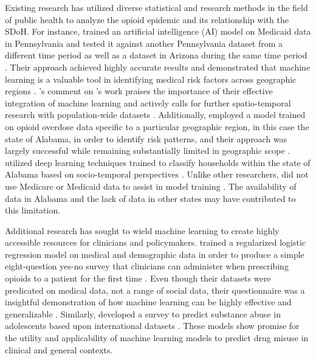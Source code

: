 \documentclass[journal]{IEEEtran}
\begin{document}
	Existing research has utilized diverse statistical and research methods in the field of public health to analyze the opioid epidemic and its relationship with the SDoH. For instance, \citeauthor{lo-ciganicDevelopingValidatingMachinelearning2022} trained an artificial intelligence (AI) model on Medicaid data in Pennsylvania and tested it against another Pennsylvania dataset from a different time period as well as a dataset in Arizona during the same time period \cite{lo-ciganicDevelopingValidatingMachinelearning2022}. Their approach achieved highly accurate results and demonstrated that machine learning is a valuable tool in identifying medical risk factors across geographic regions \cite{lo-ciganicDevelopingValidatingMachinelearning2022}. \citeauthor{allenOpportunitiesOpioidOverdose2022}'s comment on \citeauthor{lo-ciganicDevelopingValidatingMachinelearning2022}'s work praises the importance of their effective integration of machine learning and actively calls for further spatio-temporal research with population-wide datasets \cite{allenOpportunitiesOpioidOverdose2022}. Additionally, \citeauthor{partonMachineLearningApproach2026} employed a model trained on opioid overdose data specific to a particular geographic region, in this case the state of Alabama, in order to identify risk patterns, and their approach was largely successful while remaining substantially limited in geographic scope \cite{partonMachineLearningApproach2026}. \citeauthor{wuDeepLearningbasedSpatiotemporal2026} utilized deep learning techniques trained to classify households within the state of Alabama based on socio-temporal perspectives \cite{wuDeepLearningbasedSpatiotemporal2026}. Unlike other researchers, \citeauthor{wuDeepLearningbasedSpatiotemporal2026} did not use Medicare or Medicaid data to assist in model training \cite{wuDeepLearningbasedSpatiotemporal2026}. The availability of data in Alabama and the lack of data in other states may have contributed to this limitation.

	Additional research has sought to wield machine learning to create highly accessible resources for clinicians and policymakers. \citeauthor{repsWisdomCROUDDevelopment2020} trained a regularized logistic regression model on medical and demographic data in order to produce a simple eight-question yes-no survey that clinicians can administer when prescribing opioids to a patient for the first time \cite{repsWisdomCROUDDevelopment2020}. Even though their datasets were predicated on medical data, not a range of social data, their questionnaire was a insightful demonstration of how machine learning can be highly effective and generalizable \cite{repsWisdomCROUDDevelopment2020}. Similarly, \citeauthor{kimMachineLearningBasedPrediction2025} developed a survey to predict substance abuse in adolescents based upon international datasets \cite{kimMachineLearningBasedPrediction2025}. These models show promise for the utility and applicability of machine learning models to predict drug misuse in clinical and general contexts.
\end{document}
